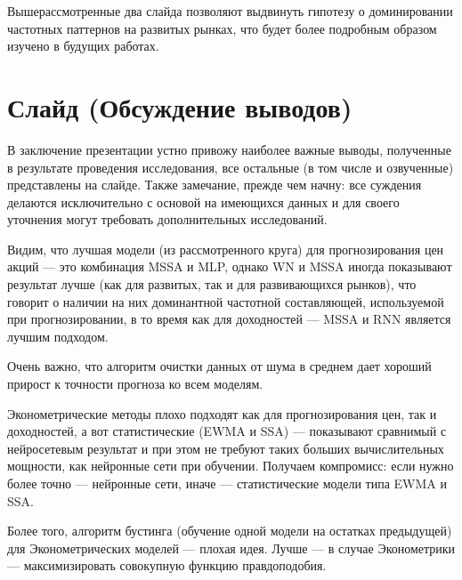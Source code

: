 \documentclass[a4paper, 12pt]{article}
\begin{document}
		Вышерассмотренные два слайда позволяют выдвинуть гипотезу о доминировании частотных паттернов на развитых рынках, что будет более подробным образом изучено в будущих работах.
	\section{Слайд (Обсуждение выводов)}
		В заключение презентации устно привожу наиболее важные выводы, полученные в результате проведения исследования, все остальные (в том числе и озвученные) представлены на слайде. Также замечание, прежде чем начну: все суждения делаются исключительно с основой на имеющихся данных и для своего уточнения могут требовать дополнительных исследований.
		
		Видим, что лучшая модели (из рассмотренного круга) для прогнозирования цен акций --- это комбинация MSSA и MLP, однако WN и MSSA иногда показывают результат лучше (как для развитых, так и для развивающихся рынков), что говорит о наличии на них доминантной частотной составляющей, используемой при прогнозировании, в то время как для доходностей --- MSSA и RNN является лучшим подходом.
		
		Очень важно, что алгоритм очистки данных от шума в среднем дает хороший прирост к точности прогноза ко всем моделям.
		
		Эконометрические методы плохо подходят как для прогнозирования цен, так и доходностей, а вот статистические (EWMA и SSA) --- показывают сравнимый с нейросетевым результат и при этом не требуют таких больших вычислительных мощности, как нейронные сети при обучении. Получаем компромисс: если нужно более точно --- нейронные сети, иначе --- статистические модели типа EWMA и SSA.
		
		Более того, алгоритм бустинга (обучение одной модели на остатках предыдущей) для Эконометрических моделей --- плохая идея. Лучше --- в случае Эконометрики --- максимизировать совокупную функцию правдоподобия.
\end{document}
